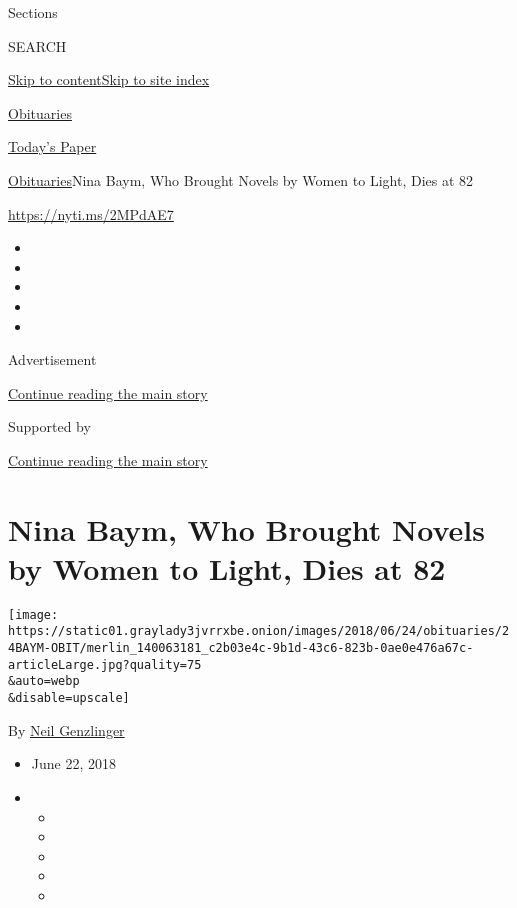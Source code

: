 Sections

SEARCH

\protect\hyperlink{site-content}{Skip to
content}\protect\hyperlink{site-index}{Skip to site index}

\href{https://www.nytimes3xbfgragh.onion/section/obituaries}{Obituaries}

\href{https://myaccount.nytimes3xbfgragh.onion/auth/login?response_type=cookie\&client_id=vi}{}

\href{https://www.nytimes3xbfgragh.onion/section/todayspaper}{Today's
Paper}

\href{/section/obituaries}{Obituaries}\textbar{}Nina Baym, Who Brought
Novels by Women to Light, Dies at 82

\url{https://nyti.ms/2MPdAE7}

\begin{itemize}
\item
\item
\item
\item
\item
\end{itemize}

Advertisement

\protect\hyperlink{after-top}{Continue reading the main story}

Supported by

\protect\hyperlink{after-sponsor}{Continue reading the main story}

\hypertarget{nina-baym-who-brought-novels-by-women-to-light-dies-at-82}{%
\section{Nina Baym, Who Brought Novels by Women to Light, Dies at
82}\label{nina-baym-who-brought-novels-by-women-to-light-dies-at-82}}

\texttt{[image: https://static01.graylady3jvrrxbe.onion/images/2018/06/24/obituaries/24BAYM-OBIT/merlin\_140063181\_c2b03e4c-9b1d-43c6-823b-0ae0e476a67c-articleLarge.jpg?quality=75\\\&auto=webp\\\&disable=upscale]}

By \href{http://www.nytimes3xbfgragh.onion/by/neil-genzlinger}{Neil
Genzlinger}

\begin{itemize}
\item
  June 22, 2018
\item
  \begin{itemize}
  \item
  \item
  \item
  \item
  \item
  \end{itemize}
\end{itemize}

